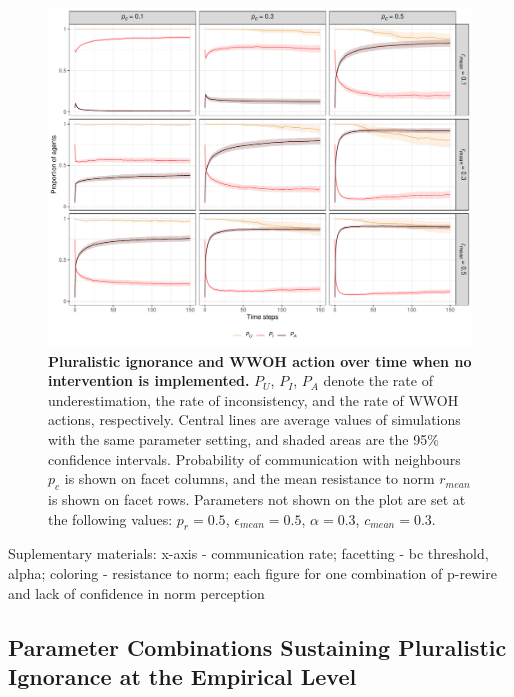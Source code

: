 \documentclass[
  11pt,
]{article}
\begin{document}
\begin{figure}[h]
  \centering
  \includegraphics[width=1\columnwidth]{./figures/factor_for_pi.pdf}
  \caption{\textbf{Pluralistic ignorance and WWOH action over time when no intervention is implemented.} $P_U$, $P_I$, $P_A$ denote the rate of underestimation, the rate of inconsistency, and the rate of WWOH actions, respectively. Central lines are average values of simulations with the same parameter setting, and shaded areas are the 95\% confidence intervals. Probability of communication with neighbours $p_c$ is shown on facet columns, and the mean resistance to norm $r_{mean}$ is shown on facet rows. Parameters not shown on the plot are set at the following values: $p_r = 0.5$, $\epsilon_{mean} = 0.5$, $\alpha = 0.3$, $c_{mean} = 0.3$.}
  \label{fig:2}
\end{figure}

Suplementary materials: x-axis - communication rate; facetting - bc
threshold, alpha; coloring - resistance to norm; each figure for one
combination of p-rewire and lack of confidence in norm perception

\hypertarget{parameter-combinations-sustaining-pluralistic-ignorance-at-the-empirical-level}{%
\subsection{Parameter Combinations Sustaining Pluralistic Ignorance at
the Empirical
Level}\label{parameter-combinations-sustaining-pluralistic-ignorance-at-the-empirical-level}}
\end{document}
